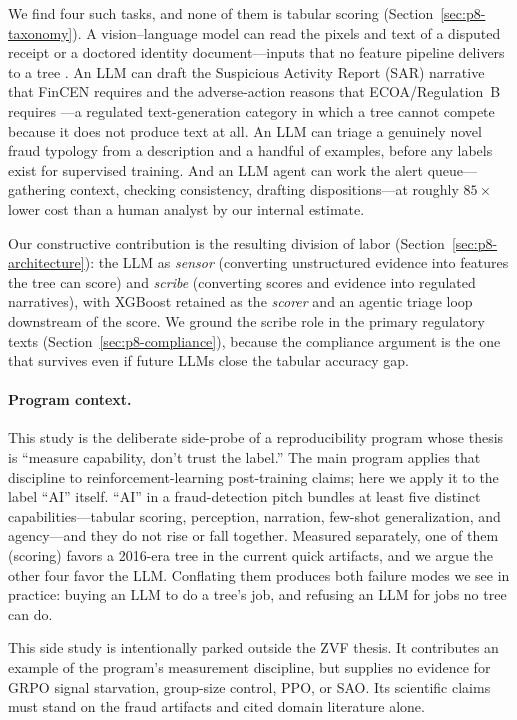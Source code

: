 \documentclass{article}
\providecommand{\secref}[1]{Section~\ref{#1}}
\begin{document}
We find four such tasks, and none of them is tabular scoring
(\secref{sec:p8-taxonomy}). A vision--language model can read the pixels and
text of a disputed receipt or a doctored identity document---inputs that no
feature pipeline delivers to a tree \citep{xu2024fakeshield,
wang2025forensicsbench}. An LLM can draft the Suspicious Activity Report (SAR)
narrative that FinCEN requires and the adverse-action reasons that
ECOA/Regulation~B requires \citep{fincen2003sarnarrative, cfr1002_9}---a
regulated text-generation category in which a tree cannot compete because it
does not produce text at all. An LLM can triage a genuinely novel fraud
typology from a description and a handful of examples, before any labels exist
for supervised training. And an LLM agent can work the alert queue---gathering
context, checking consistency, drafting dispositions---at roughly $85\times$
lower cost than a human analyst by our internal estimate.

Our constructive contribution is the resulting division of labor
(\secref{sec:p8-architecture}): the LLM as \emph{sensor} (converting
unstructured evidence into features the tree can score) and \emph{scribe}
(converting scores and evidence into regulated narratives), with XGBoost
retained as the \emph{scorer} and an agentic triage loop downstream of the
score. We ground the scribe role in the primary regulatory texts
(\secref{sec:p8-compliance}), because the compliance argument is the one that
survives even if future LLMs close the tabular accuracy gap.

\paragraph{Program context.} This study is the deliberate side-probe of a
reproducibility program whose thesis is ``measure capability, don't trust the
label.'' The main program applies that discipline to reinforcement-learning
post-training claims; here we apply it to the label ``AI'' itself. ``AI'' in a
fraud-detection pitch bundles at least five distinct capabilities---tabular
scoring, perception, narration, few-shot generalization, and agency---and they
do not rise or fall together. Measured separately, one of them (scoring)
favors a 2016-era tree in the current quick artifacts, and we argue the other four
favor the LLM. Conflating them produces both failure
modes we see in practice: buying an LLM to do a tree's job, and refusing an LLM
for jobs no tree can do.

This side study is intentionally parked outside the ZVF thesis. It contributes
an example of the program's measurement discipline, but supplies no evidence for
GRPO signal starvation, group-size control, PPO, or SAO. Its scientific claims
must stand on the fraud artifacts and cited domain literature alone.
\end{document}
